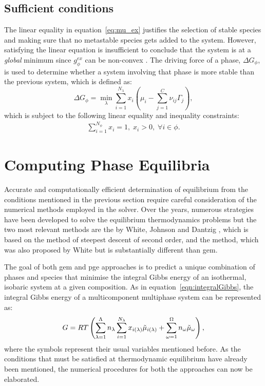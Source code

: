 \subsection{Sufficient conditions}
	The linear equality in equation~\eqref{eq:mu_ex} justifies the selection of stable species and making sure that no metastable species gets added to the system. However, satisfying the linear equation is insufficient to conclude that the system is at a \emph{global} minimum since $g_{\phi}^{ex}$ can be non-convex \cite{Piro16}. The driving force of a phase, $\Delta G_{\phi} $, is used to determine whether a system involving that phase is more stable than the previous system, which is defined as:
	\begin{equation}
        		\Delta G_{\phi}= \min_{\lambda} \sum_{i=1}^{N_{\lambda}}x_{i} \left (\mu_{i} - \sum_{j=1}^C \nu_{ij}\Gamma_j \right ),
    	\end{equation}
	which is subject to the following linear equality and inequality constraints:
	\begin{align}
		\sum_{i=1}^{N_\phi} x_i = 1, \; x_i > 0, \; \forall i \in \phi.
	\end{align}
	

\section{Computing Phase Equilibria}
Accurate and computationally efficient determination of equilibrium from the conditions mentioned in the previous section require careful consideration of the numerical methods employed in the solver. Over the years, numerous strategies have been developed to solve the equilibrium thermodynamics problems but the two most relevant methods are the \emph{} by White, Johnson and Dantzig \cite{White:58}, which is based on the method of steepest descent of second order, and the \emph{} method, which was also proposed by White \cite{White67} but is substantially different than \gls{gem}.

The goal of both \gls{gem} and \gls{pge} approaches is to predict a unique combination of phases and species that minimise the integral Gibbs energy of an isothermal, isobaric system at a given composition. As in equation~\eqref{eqn:integralGibbs}, the integral Gibbs energy of a multicomponent multiphase system can be represented as:
\begin{equation}\label{eq:int_gibbs}
    G = RT \left(\sum_{\lambda=1}^{\Lambda} n_\lambda \sum_{i = 1}^{N_{\lambda}} x_{i(\lambda)} \tilde{\mu}_{i(\lambda)} + \sum_{\omega=1}^{\Omega} n_\omega \tilde{\mu}_{\omega}\right),
\end{equation}
where the symbols represent their usual variables mentioned before. 
As the conditions that must be satisfied at thermodynamic equilibrium have already been mentioned, the numerical procedures for  both the approaches can now be elaborated.

